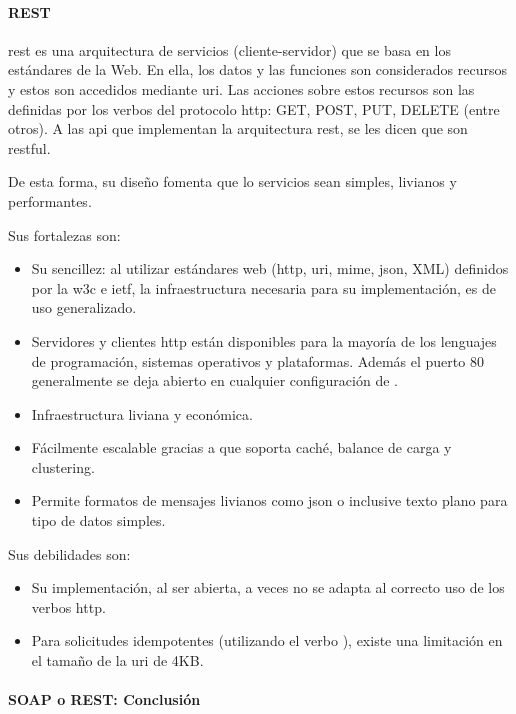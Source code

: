 \paragraph{REST}
\label{rest}

\gls{rest}\cite{fielding2000rest} es una arquitectura de servicios (cliente-servidor) que se basa en los estándares de la Web. En ella, los datos y las funciones son considerados recursos y estos son accedidos mediante \gls{uri}. Las acciones sobre estos recursos son las definidas por los verbos del protocolo \gls{http}: GET, POST, PUT, DELETE (entre otros). A las \gls{api} que implementan la arquitectura \gls{rest}, se les dicen que son \gls{restful}.

De esta forma, su diseño fomenta que lo servicios sean simples, livianos y performantes.

Sus fortalezas son\cite{pautasso2008restful}:
\begin{itemize}
\item Su sencillez: al utilizar estándares web (\gls{http}, \gls{uri}, \gls{mime}, \gls{json}, \gls{XML}) definidos por la \gls{w3c} e \gls{ietf}, la infraestructura necesaria para su implementación, es de uso generalizado.
\item Servidores y clientes \gls{http} están disponibles para la mayoría de los lenguajes de programación, sistemas operativos y plataformas. Además el puerto 80 generalmente se deja abierto en cualquier configuración de .
\item Infraestructura liviana y económica.
\item Fácilmente escalable gracias a que soporta caché, balance de carga y \gls{clustering}.
\item Permite formatos de mensajes livianos como \gls{json} o inclusive texto plano para tipo de datos simples.
\end{itemize}

Sus debilidades son:
\begin{itemize}
\item Su implementación, al ser abierta, a veces no se adapta al correcto uso de los verbos \gls{http}.
\item Para solicitudes idempotentes (utilizando el verbo ), existe una limitación en el tamaño de la \gls{uri} de 4KB.
\end{itemize}

\paragraph{SOAP o REST: Conclusión}
\label{soap_vs_rest}

